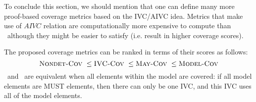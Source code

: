 
To conclude this section, we should mention that one can define many more proof-based coverage metrics based on the IVC/AIVC idea. Metrics that make use of $AIVC$ relation are computationally more expensive to compute than \ivccov\ although they might be easier to satisfy (i.e. result in higher coverage scores).

The proposed coverage metrics can be ranked in terms of their scores as follows:
$$\text{\sc Nondet-Cov}\ \leq \text{\sc IVC-Cov}\ \leq \text{\sc May-Cov}\ \leq \text{\sc Model-Cov}$$
\ivccov\ and \nondetcov\ are equivalent when all elements within the model are covered: if all model elements are MUST elements, then there can only be one IVC, and this IVC uses all of the model elements.


